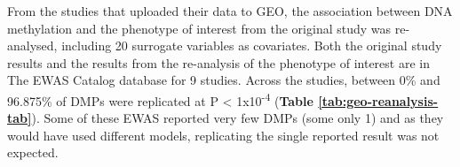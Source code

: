 \documentclass[11pt,oneside]{bristolthesis}
\begin{document}
From the studies that uploaded their data to GEO, the association between DNA methylation and the phenotype of interest from the original study was re-analysed, including 20 surrogate variables as covariates. Both the original study results and the results from the re-analysis of the phenotype of interest are in The EWAS Catalog database for 9 studies. Across the studies, between 0\% and 96.875\% of DMPs were replicated at P \textless{} 1x10\textsuperscript{-4} (\textbf{Table \ref{tab:geo-reanalysis-tab}}). Some of these EWAS reported very few DMPs (some only 1) and as they would have used different models, replicating the single reported result was not expected. \linebreak
\begin{table}[!h]

\caption{\label{tab:geo-reanalysis-tab}GEO re-analysis replication}
\centering
{}
\end{table}
\linebreak
\end{document}
